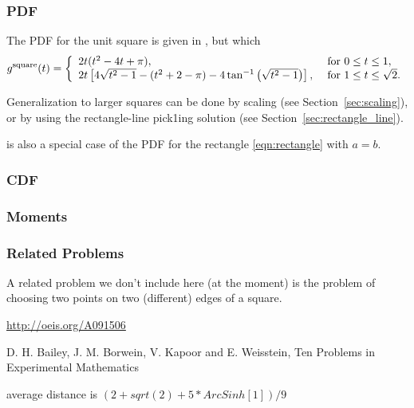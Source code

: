 \subsubsection{PDF}

The PDF for the unit square is given in
\cite{philip:_probab_distr_distan_between_two,weisstein:_squar_line_picking},
but which
\begin{equation}
  \label{eq:square_line}
  g^{\rm square}(t) = \left\{ \begin{array}{ll}
      2t (t^2-4t+\pi), & \mbox{ for } 0 \leq t \leq 1, \\
      2t \left[4 \sqrt{t^2-1} - (t^2+2-\pi) - 4 \tan^{-1} \left(\sqrt{t^2-1} \right)\right], 
               & \mbox{ for } 1 \leq t \leq \sqrt{2} . \\ 
    \end{array} \right.
\end{equation}

Generalization to larger squares can be done by scaling (see
Section~\ref{sec:scaling}), or by using the rectangle-line pick1ing
solution (see Section~\ref{sec:rectangle_line}).


 is also a special case of the PDF for the rectangle
\eqref{eqn:rectangle} with $a=b$.

\subsubsection{CDF}


\subsubsection{Moments}



\subsubsection{Related Problems}

A related problem we don't include here (at the moment) is the problem
of choosing two points on two (different) edges of a square.

\url{http://oeis.org/A091506}

D. H. Bailey, J. M. Borwein, V. Kapoor and E. Weisstein, Ten Problems
in Experimental Mathematics

average distance is $(2 + sqrt(2) + 5*ArcSinh[1])/9$

